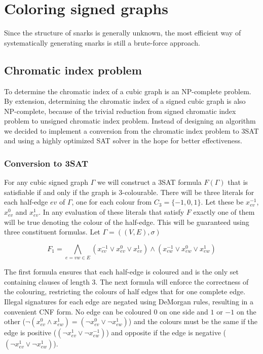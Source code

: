 \chapter{Coloring signed graphs}

Since the structure of snarks is generally unknown, the most efficient way of systematically generating snarks is still a brute-force approach.

\section{Chromatic index problem}

To determine the chromatic index of a cubic graph is an NP-complete problem. By extension, determining the chromatic index of a signed cubic graph is also NP-complete, because of the trivial reduction from signed chromatic index problem to unsigned chromatic index problem. Instead of designing an algorithm we decided to implement a conversion from the chromatic index problem to 3SAT and using a highly optimized SAT solver in the hope for better effectiveness.

\subsection{Conversion to 3SAT}

For any cubic signed graph $\Gamma$ we will construct a 3SAT formula $F(\Gamma)$ that is satisfiable if and only if the graph is 3-colourable. There will be three literals for each half-edge $ev$ of $\Gamma$, one for each colour from $C_3 = \{-1, 0, 1\}$. Let these be $x^{-1}_{ev}$, $x^{0}_{ev}$ and $x^{1}_{ev}$. In any evaluation of these literals that satisfy $F$ exactly one of them will be true denoting the colour of the half-edge. This will be guaranteed using three constituent formulas. Let $\Gamma = ((V, E), \sigma)$

$$F_1 = \bigwedge _{e = vw \in E} (x^{-1}_{ev} \vee x^{0}_{ev} \vee x^{1}_{ev}) \wedge (x^{-1}_{ew} \vee x^{0}_{ew} \vee x^{1}_{ew}) $$

The first formula ensures that each half-edge is coloured and is the only set containing clauses of length 3. The next formula will enforce the correctness of the colouring, restricting the colours of half edges that for one complete edge. Illegal signatures for each edge are negated using DeMorgan rules, resulting in a convenient CNF form. No edge can be coloured $0$ on one side and $1$ or $-1$ on the other ($\neg (x^{0}_{ev} \land x^{1}_{ew}) = (\neg x^{0}_{ev} \lor \neg x^{1}_{ew})$) and the colours must be the same if the edge is positive ($(\neg x^{1}_{ev} \lor \neg x^{-1}_{ew})$) and opposite if the edge is negative ($(\neg x^{1}_{ev} \lor \neg x^{1}_{ew})$).

